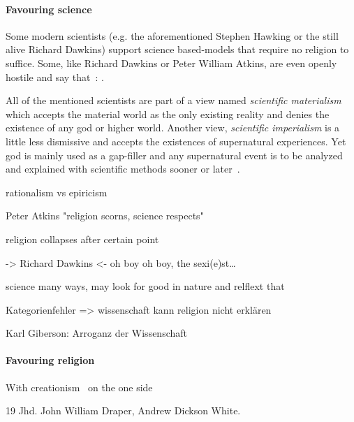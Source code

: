 \paragraph{Favouring science}
Some modern scientists (e.g. the aforementioned Stephen Hawking or the still alive Richard Dawkins) support science based-models that require no religion to suffice.
Some, like Richard Dawkins or Peter William Atkins, are even openly hostile and say that~\cite{dawkins2006god}: .

All of the mentioned scientists are part of a view named \emph{scientific materialism} which accepts the material world as the only existing reality and denies the existence of any god or higher world.
Another view, \emph{scientific imperialism} is a little less dismissive and accepts the existences of supernatural experiences.
Yet god is mainly used as a gap-filler and any supernatural event is to be analyzed and explained with scientific methods sooner or later~\cite{krishna1971gopi}.



rationalism vs epiricism

Peter Atkins "religion scorns, science respects"

religion collapses after certain point

-> Richard Dawkins <- oh boy oh boy, the sexi(e)st\ldots


science many ways, may look for good in nature and relflext that

Kategorienfehler => wissenschaft kann religion nicht erklären

Karl Giberson: Arroganz der Wissenschaft

\paragraph{Favouring religion}
With creationism~\cite{Hameed1637} on the one side


19 Jhd. John William Draper, Andrew Dickson White.

